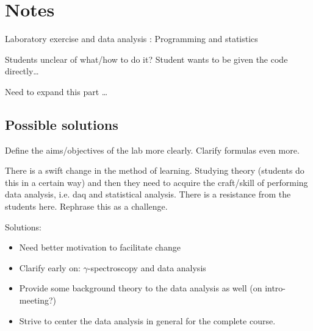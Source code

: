\documentclass[]{article}
\begin{document}
\section{Notes}
Laboratory exercise and data analysis : Programming and statistics

Students unclear of what/how to do it? Student wants to be given the code directly\dots

Need to expand this part \dots


\subsection{Possible solutions}
Define the aims/objectives of the lab more clearly. Clarify formulas even more.

There is a swift change in the method of learning.
Studying theory (students do this in a certain way) and then they need to acquire the craft/skill of performing data analysis, i.e. daq and statistical analysis.
There is a resistance from the students here.
Rephrase this as a challenge.

Solutions:
\begin{itemize}
  \item Need better motivation to facilitate change
  \item Clarify early on: $\gamma$-spectroscopy and data analysis
  \item Provide some background theory to the data analysis as well (on intro-meeting?)
  \item Strive to center the data analysis in general for the complete course.
\end{itemize}
\end{document}
